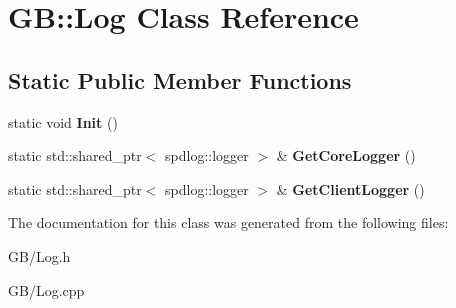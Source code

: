\hypertarget{class_g_b_1_1_log}{}\section{GB\+::Log Class Reference}
\label{class_g_b_1_1_log}
\subsection*{Static Public Member Functions}
\begin{DoxyCompactItemize}
\item 
\mbox{\label{class_g_b_1_1_log_a5af747e394e5062e8163154a0b85bdbb}} 
static void {\bfseries Init} ()
\item 
\mbox{\label{class_g_b_1_1_log_a5076d2bc062230b48aa33214a67adf3c}} 
static std\+::shared\+\_\+ptr$<$ spdlog\+::logger $>$ \& {\bfseries Get\+Core\+Logger} ()
\item 
\mbox{\label{class_g_b_1_1_log_abeaaa9ab6dd3188c0814103cd8b9363f}} 
static std\+::shared\+\_\+ptr$<$ spdlog\+::logger $>$ \& {\bfseries Get\+Client\+Logger} ()
\end{DoxyCompactItemize}


The documentation for this class was generated from the following files\+:\begin{DoxyCompactItemize}
\item 
G\+B/Log.\+h\item 
G\+B/Log.\+cpp\end{DoxyCompactItemize}
